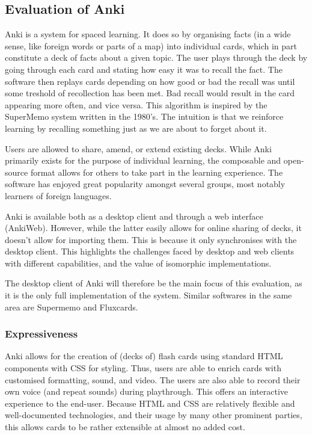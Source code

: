 \subsection{Evaluation of Anki}

Anki is a system for spaced learning. It does so by organising facts (in a wide
sense, like foreign words or parts of a map) into individual cards, which in
part constitute a deck of facts about a given topic. The user plays through the
deck by going through each card and stating how easy it was to recall the fact.
The software then replays cards depending on how good or bad the recall was
until some treshold of recollection has been met. Bad recall would result in the
card appearing more often, and vice versa. This algorithm is inspired by the
SuperMemo system written in the 1980's. The intuition is that we reinforce
learning by recalling something just as we are about to forget about it.

Users are allowed to share, amend, or extend existing decks. While Anki
primarily exists for the purpose of individual learning, the composable and
open-source format allows for others to take part in the learning experience.
The software has enjoyed great popularity amongst several groups, most notably
learners of foreign languages.

Anki is available both as a desktop client and through a web interface
(AnkiWeb). However, while the latter easily allows for online sharing of decks,
it doesn't allow for importing them. This is because it only synchronises with
the desktop client. This highlights the challenges faced by desktop and web
clients with different capabilities, and the value of isomorphic
implementations.

The desktop client of Anki will therefore be the main focus of this evaluation,
as it is the only full implementation of the system. Similar softwares in the
same area are Supermemo and Fluxcards.

\subsubsection{Expressiveness}

Anki allows for the creation of (decks of) flash cards using standard HTML
components with CSS for styling. Thus, users are able to enrich cards with
customised formatting, sound, and video. The users are also able to record their
own voice (and repeat sounds) during playthrough. This offers an interactive
experience to the end-user. Because HTML and CSS are relatively flexible and
well-documented technologies, and their usage by many other prominent parties,
this allows cards to be rather extensible at almost no added cost.

